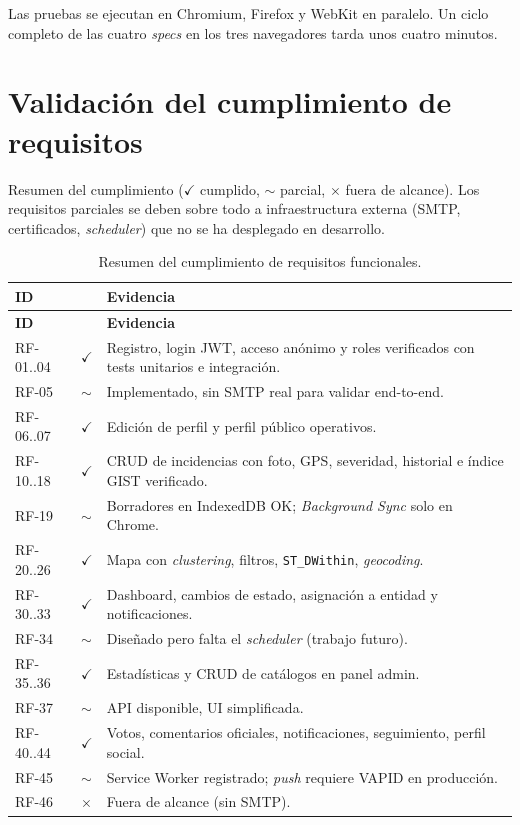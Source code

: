 Las pruebas se ejecutan en Chromium, Firefox y WebKit en paralelo. Un ciclo completo de las cuatro \textit{specs} en los tres navegadores tarda unos cuatro minutos.


\section{Validación del cumplimiento de requisitos}
\label{sec:validacion-requisitos}

Resumen del cumplimiento ($\checkmark${} cumplido, $\sim${} parcial, $\times${} fuera de alcance). Los requisitos parciales se deben sobre todo a infraestructura externa (SMTP, certificados, \textit{scheduler}) que no se ha desplegado en desarrollo.

\begin{longtable}{@{}L{1.5cm}L{1cm}L{10cm}@{}}
\caption{Resumen del cumplimiento de requisitos funcionales.} \label{tab:validacion-rf} \\
\toprule
\textbf{ID} & \textbf{} & \textbf{Evidencia} \\
\midrule
\endfirsthead
\toprule
\textbf{ID} & \textbf{} & \textbf{Evidencia} \\
\midrule
\endhead
\bottomrule
\endfoot
RF-01..04 & $\checkmark$ & Registro, login JWT, acceso anónimo y roles verificados con tests unitarios e integración. \\
RF-05     & $\sim$ & Implementado, sin SMTP real para validar end-to-end. \\
RF-06..07 & $\checkmark$ & Edición de perfil y perfil público operativos. \\
RF-10..18 & $\checkmark$ & CRUD de incidencias con foto, GPS, severidad, historial e índice GIST verificado. \\
RF-19     & $\sim$ & Borradores en IndexedDB OK; \textit{Background Sync} solo en Chrome. \\
RF-20..26 & $\checkmark$ & Mapa con \textit{clustering}, filtros, \texttt{ST\_DWithin}, \textit{geocoding}. \\
RF-30..33 & $\checkmark$ & Dashboard, cambios de estado, asignación a entidad y notificaciones. \\
RF-34     & $\sim$ & Diseñado pero falta el \textit{scheduler} (trabajo futuro). \\
RF-35..36 & $\checkmark$ & Estadísticas y CRUD de catálogos en panel admin. \\
RF-37     & $\sim$ & API disponible, UI simplificada. \\
RF-40..44 & $\checkmark$ & Votos, comentarios oficiales, notificaciones, seguimiento, perfil social. \\
RF-45     & $\sim$ & Service Worker registrado; \textit{push} requiere VAPID en producción. \\
RF-46     & $\times$ & Fuera de alcance (sin SMTP). \\
\end{longtable}

